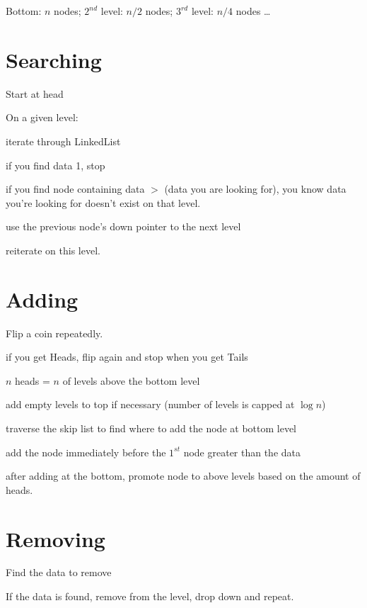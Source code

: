 \documentclass[english,openany]{book}
\begin{document}
    Bottom: $n$ nodes; $2^{nd}$ level: $n/2$ nodes; $3^{rd}$ level: $n/4$ nodes \dots\\

    \section{Searching}

    Start at head

    On a given level:

    \quad iterate through LinkedList

    \quad\quad if you find data 1, stop

    \quad\quad if you find node containing data $>$ (data you are looking for), you know data you're looking for doesn't exist on that level.

    \quad\quad use the previous node's down pointer to the next level

    \quad\quad reiterate on this level.\\

    \section{Adding}

    Flip a coin repeatedly.

    \quad if you get Heads, flip again and stop when you get Tails

    \quad $n$ heads = $n$ of levels above the bottom level

    \quad add empty levels to top if necessary (number of levels is capped at $\log n$)

    \quad traverse the skip list to find where to add the node at bottom level

    \quad\quad add the node immediately before the $1^{st}$ node greater than the data

    \quad\quad after adding at the bottom, promote node to above levels based on the amount of heads.\\

    \section{Removing}

    Find the data to remove

    If the data is found, remove from the level, drop down and repeat.\\
\end{document}
